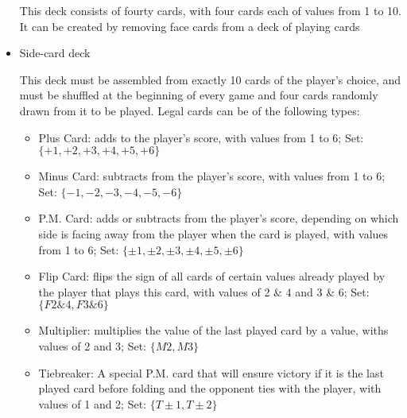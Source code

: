 \documentclass[12pt, landscape]{article}
\begin{document}
\begin{FlushLeft}
\begin{multicols}{2}
\begin{itemize}
				This deck consists of fourty cards, with four cards each of values from 1 to 10. It can be created by removing face cards from a deck of playing cards

				\item Side-card deck

				This deck must be assembled from exactly 10 cards of the player's choice, and must be shuffled at the beginning of every game and four cards randomly drawn from it to be played. Legal cards can be of the following types:

				\begin{itemize}
					\item Plus Card: adds to the player's score, with values from 1 to 6; Set: $\{+1, +2, +3, +4, +5, +6\}$
					\item Minus Card: subtracts from the player's score, with values from 1 to 6; Set: $\{-1, -2, -3, -4, -5, -6\}$
					\item P.M. Card: adds or subtracts from the player's score, depending on which side is facing away from the player when the card is played, with values from 1 to 6; Set: $\{\pm1, \pm2, \pm3, \pm4, \pm5, \pm6\}$
					\item Flip Card: flips the sign of all cards of certain values already played by the player that plays this card, with values of 2 \& 4 and 3 \& 6; Set: $\{F2\&4, F3\&6\}$
					\item Multiplier: multiplies the value of the last played card by a value, withs values of 2 and 3; Set: $\{M2, M3\}$
					\item Tiebreaker: A special P.M. card that will ensure victory if it is the last played card before folding and the opponent ties with the player, with values of 1 and 2; Set: $\{T\pm1, T\pm2\}$
				\end{itemize}
			\end{itemize}
			\vfill \null
		\end{multicols}
	\end{FlushLeft}
\end{document}
